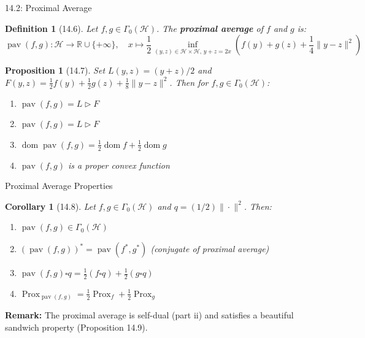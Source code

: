 \documentclass[aspectratio=169,10pt]{beamer}
\newtheorem{prop}{Proposition}
\newtheorem{dfn}{Definition}
\newtheorem{cor}{Corollary}
\DeclareMathOperator{\dom}{dom}
\DeclareMathOperator{\pav}{pav}
\DeclareMathOperator{\Prox}{Prox}
\begin{document}
\begin{frame}{14.2: Proximal Average}
  \vspace{-0.3cm}

  \begin{dfn}[14.6]
    Let $f, g \in \Gamma_0(\mathcal{H})$. The \textbf{proximal average} of $f$ and $g$ is:
    \[
      \pav(f,g) : \mathcal{H} \to \mathbb{R} \cup \{+\infty\}, \quad
      x \mapsto \frac{1}{2}\inf_{(y,z) \in \mathcal{H} \times \mathcal{H}, \, y+z=2x}
      \left( f(y) + g(z) + \frac{1}{4}\|y-z\|^2 \right)
    \]
  \end{dfn}

  \vspace{0.2cm}

  \begin{prop}[14.7]
    Set $L(y,z) = (y+z)/2$ and $F(y,z) = \frac{1}{2}f(y) + \frac{1}{2}g(z) + \frac{1}{8}\|y-z\|^2$.
    Then for $f, g \in \Gamma_0(\mathcal{H})$:
    \begin{enumerate}
      \item[(i)] $\pav(f,g) = L \triangleright F$
      \item[(ii)] $\pav(f,g) = L \triangleright F$
      \item[(iii)] $\dom \pav(f,g) = \frac{1}{2}\dom f + \frac{1}{2}\dom g$
      \item[(iv)] $\pav(f,g)$ is a proper convex function
    \end{enumerate}
  \end{prop}
\end{frame}

\begin{frame}{Proximal Average Properties}
  \vspace{-0.3cm}

  \begin{cor}[14.8]
    Let $f, g \in \Gamma_0(\mathcal{H})$ and $q = (1/2)\|\cdot\|^2$. Then:
    \begin{enumerate}
      \item[(i)] $\pav(f,g) \in \Gamma_0(\mathcal{H})$
      \item[(ii)] $(\pav(f,g))^* = \pav(f^*, g^*)$ (conjugate of proximal average)
      \item[(iii)] $\pav(f,g) \square q = \frac{1}{2}(f \square q) + \frac{1}{2}(g \square q)$
      \item[(iv)] $\Prox_{\pav(f,g)} = \frac{1}{2}\Prox_f + \frac{1}{2}\Prox_g$
    \end{enumerate}
  \end{cor}

  \vspace{0.3cm}

  \textbf{Remark:} The proximal average is self-dual (part ii) and satisfies a
  beautiful sandwich property (Proposition 14.9).
\end{frame}
\end{document}
